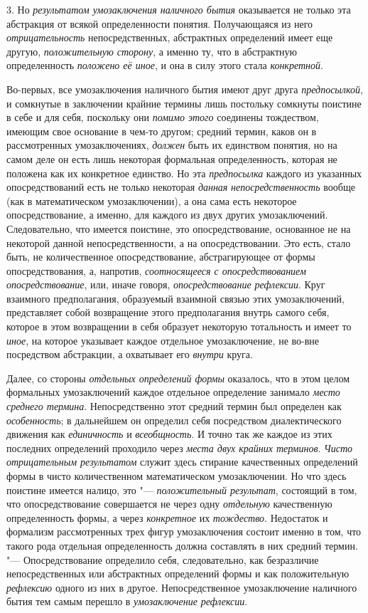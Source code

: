 {{3. Но {\em результатом
умозаключения наличного бытия} оказывается не только эта
абстракция от всякой определенности понятия. Получающаяся из него
{\em отрицательность}
непосредственных, абстрактных определений имеет еще другую,
{\em положительную сторону},
а именно ту, что в абстрактную определенность
{\em положено её иное},
и она в силу этого стала
{\em конкретной}.

Во-первых, все умозаключения наличного бытия имеют друг друга
{\em предпосылкой}, и
сомкнутые в заключении крайние термины лишь постольку сомкнуты поистине в
себе и для себя, поскольку они
{\em помимо этого}
соединены тождеством, имеющим свое основание в чем-то другом;
средний термин, каков он в рассмотренных умозаключениях,
{\em должен} быть их
единством понятия, но на самом деле он есть лишь некоторая формальная
определенность, которая не положена как их конкретное единство. Но эта
{\em предпосылка} каждого
из указанных опосредствований есть не только некоторая
{\em данная
}{\em непосредственность}
вообще (как в математическом умозаключении), а она сама есть
некоторое опосредствование, а именно, для каждого из двух других
умозаключений. Следовательно, что имеется поистине, это опосредствование,
основанное не на некоторой данной непосредственности, а на
опосредствовании. Это есть, стало быть, не количественное опосредствование,
абстрагирующее от формы опосредствования, а, напротив,
{\em соотносящееся с опосредствованием
опосредствование}, или, иначе говоря,
{\em опосредствование рефлексии}.
Круг взаимного предполагания, образуемый взаимной связью этих
умозаключений, представляет собой возвращение этого предполагания внутрь
самого себя, которое в этом возвращении в себя образует некоторую
тотальность и имеет то {\em иное},
на которое указывает каждое отдельное умозаключение, не
во-вне посредством абстракции, а охватывает его
{\em внутри} круга.

Далее, со стороны
{\em отдельных определений формы}
оказалось, что в этом целом формальных умозаключений каждое
отдельное определение занимало
{\em место среднего термина}.
Непосредственно этот средний термин был определен как
{\em особенность}; в
дальнейшем он определил себя посредством диалектического движения как
{\em единичность} и
{\em всеобщность}. И
точно так же каждое из этих последних определений проходило через
{\em места двух крайних терминов}.
{\em Чисто отрицательным результатом}
служит здесь стирание качественных определений формы в чисто
количественном математическом умозаключении. Но что здесь поистине имеется
налицо, это "--- {\em положительный
результат}, состоящий в том, что опосредствование
совершается не через одну
{\em отдельную}
качественную определенность формы, а через
{\em конкретное} их
{\em тождество}.
Недостаток и формализм рассмотренных трех фигур умозаключения
состоит именно в том, что такого рода отдельная определенность должна
составлять в них средний термин. "--- Опосредствование
определило себя, следовательно, как безразличие непосредственных или
абстрактных определений формы и как положительную
{\em рефлексию} одного из
них в другое. \label{bkm:bm110b}Непосредственное
умозаключение наличного бытия тем самым перешло в
{\em умозаключение рефлексии}.

}}
